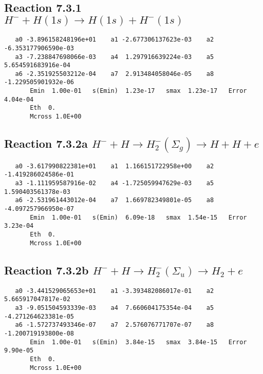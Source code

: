 \documentclass[12pt,dvipdfm]{article}
\begin{document}
\newpage
\subsection{
Reaction 7.3.1 $   H^- + H(1s) \rightarrow H(1s) + H^-(1s)$}


\begin{small}\begin{verbatim}
   a0 -3.896158248196e+01    a1 -2.677306137623e-03    a2 -6.353177906590e-03
   a3 -7.238847698066e-03    a4  1.297916639224e-03    a5  5.654591683916e-04
   a6 -2.351925503212e-04    a7  2.913484058046e-05    a8 -1.229505901932e-06
       Emin  1.00e-01   s(Emin)  1.23e-17   smax  1.23e-17   Error  4.04e-04
       Eth  0.
       Mcross 1.0E+00
\end{verbatim}\end{small}

\newpage
\subsection{
Reaction 7.3.2a $   H^- + H \rightarrow H_2^-(\Sigma_g) \rightarrow H + H + e$}


\begin{small}\begin{verbatim}
   a0 -3.617990822381e+01    a1  1.166151722958e+00    a2 -1.419286024586e-01
   a3 -1.111959587916e-02    a4 -1.725059947629e-03    a5  1.590403561378e-03
   a6 -2.531961443012e-04    a7  1.669782349801e-05    a8 -4.097257966950e-07
       Emin  1.00e-01   s(Emin)  6.09e-18   smax  1.54e-15   Error  3.23e-04
       Eth  0.
       Mcross 1.0E+00
\end{verbatim}\end{small}

\newpage
\subsection{
Reaction 7.3.2b $   H^- + H \rightarrow H_2^-(\Sigma_u) \rightarrow H_2 + e$}


\begin{small}\begin{verbatim}
   a0 -3.441529065653e+01    a1 -3.393482086017e-01    a2  5.665917047817e-02
   a3 -9.051504593339e-03    a4  7.660604175354e-04    a5 -4.271264623381e-05
   a6 -1.572737493346e-07    a7  2.576076771707e-07    a8 -1.200719193800e-08
       Emin  1.00e-01   s(Emin)  3.84e-15   smax  3.84e-15   Error  9.90e-05
       Eth  0.
       Mcross 1.0E+00
\end{verbatim}\end{small}
\end{document}
